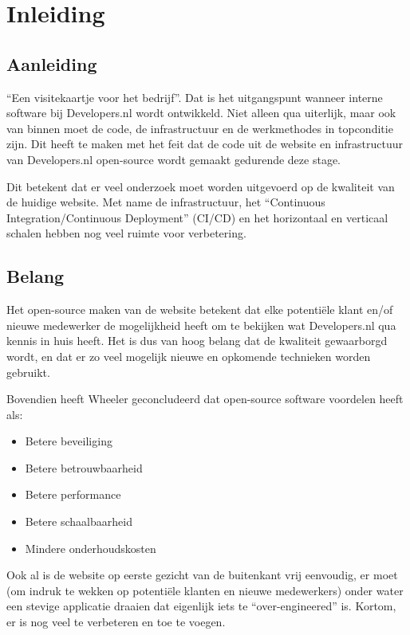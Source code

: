 \chapter{Inleiding}

\label{Chapter1}


\section{Aanleiding}
\enquote{Een visitekaartje voor het bedrijf}. Dat is het uitgangspunt wanneer interne software bij Developers.nl wordt ontwikkeld. Niet alleen qua uiterlijk, maar ook van binnen moet de code, de infrastructuur en de werkmethodes in topconditie zijn. Dit heeft te maken met het feit dat de code uit de website en infrastructuur van Developers.nl open-source wordt gemaakt gedurende deze stage.

Dit betekent dat er veel onderzoek moet worden uitgevoerd op de kwaliteit van de huidige website. Met name de infrastructuur, het \enquote{Continuous Integration/Continuous Deployment} (CI/CD) en het horizontaal en verticaal schalen hebben nog veel ruimte voor verbetering.


\section{Belang}

Het open-source maken van de website betekent dat elke potentiële klant en/of nieuwe medewerker de mogelijkheid heeft om te bekijken wat Developers.nl qua kennis in huis heeft. Het is dus van hoog belang dat de kwaliteit gewaarborgd wordt, en dat er zo veel mogelijk nieuwe en opkomende technieken worden gebruikt.

Bovendien heeft Wheeler \parencite{WhyOpenSource} geconcludeerd dat open-source software voordelen heeft als:
\begin{itemize}
	\item Betere beveiliging
	\item Betere betrouwbaarheid 
	\item Betere performance
	\item Betere schaalbaarheid
	\item Mindere onderhoudskosten
\end{itemize}
Ook al is de website op eerste gezicht van de buitenkant vrij eenvoudig, er moet (om indruk te wekken op potentiële klanten en nieuwe medewerkers) onder water een stevige applicatie draaien dat eigenlijk iets te \enquote{over-engineered} is. Kortom, er is nog veel te verbeteren en toe te voegen.

